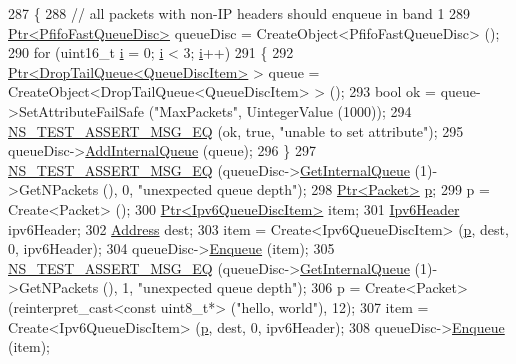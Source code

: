 \begin{DoxyCode}
287 \{
288   \textcolor{comment}{// all packets with non-IP headers should enqueue in band 1}
289   \hyperlink{classns3_1_1Ptr}{Ptr<PfifoFastQueueDisc>} queueDisc = CreateObject<PfifoFastQueueDisc> ();
290   \textcolor{keywordflow}{for} (uint16\_t \hyperlink{bernuolliDistribution_8m_a6f6ccfcf58b31cb6412107d9d5281426}{i} = 0; \hyperlink{bernuolliDistribution_8m_a6f6ccfcf58b31cb6412107d9d5281426}{i} < 3; \hyperlink{bernuolliDistribution_8m_a6f6ccfcf58b31cb6412107d9d5281426}{i}++)
291     \{
292       \hyperlink{classns3_1_1Ptr}{Ptr<DropTailQueue<QueueDiscItem>} > queue = 
      CreateObject<DropTailQueue<QueueDiscItem> > ();
293       \textcolor{keywordtype}{bool} ok = queue->SetAttributeFailSafe (\textcolor{stringliteral}{"MaxPackets"}, UintegerValue (1000));
294       \hyperlink{group__testing_ga2a9d78cffb3db8e867c35fff0b698cf5}{NS\_TEST\_ASSERT\_MSG\_EQ} (ok, \textcolor{keyword}{true}, \textcolor{stringliteral}{"unable to set attribute"});
295       queueDisc->\hyperlink{classns3_1_1QueueDisc_a0599223e2a3976ef042a56c2923a2b61}{AddInternalQueue} (queue);
296     \}
297   \hyperlink{group__testing_ga2a9d78cffb3db8e867c35fff0b698cf5}{NS\_TEST\_ASSERT\_MSG\_EQ} (queueDisc->\hyperlink{classns3_1_1QueueDisc_adf09b498c07c5677c26ea4b8309def74}{GetInternalQueue} (1)->GetNPackets 
      (), 0, \textcolor{stringliteral}{"unexpected queue depth"});
298   \hyperlink{classns3_1_1Ptr}{Ptr<Packet>} \hyperlink{lte__link__budget_8m_ac9de518908a968428863f829398a4e62}{p};
299   p = Create<Packet> ();
300   \hyperlink{classns3_1_1Ptr}{Ptr<Ipv6QueueDiscItem>} item;
301   \hyperlink{classns3_1_1Ipv6Header}{Ipv6Header} ipv6Header;
302   \hyperlink{classns3_1_1Address}{Address} dest;
303   item = Create<Ipv6QueueDiscItem> (\hyperlink{lte__link__budget_8m_ac9de518908a968428863f829398a4e62}{p}, dest, 0, ipv6Header);
304   queueDisc->\hyperlink{classns3_1_1QueueDisc_af452fb01b98fed312125163f1fe85431}{Enqueue} (item);
305   \hyperlink{group__testing_ga2a9d78cffb3db8e867c35fff0b698cf5}{NS\_TEST\_ASSERT\_MSG\_EQ} (queueDisc->\hyperlink{classns3_1_1QueueDisc_adf09b498c07c5677c26ea4b8309def74}{GetInternalQueue} (1)->GetNPackets 
      (), 1, \textcolor{stringliteral}{"unexpected queue depth"});
306   p = Create<Packet> (\textcolor{keyword}{reinterpret\_cast<}\textcolor{keyword}{const }uint8\_t*\textcolor{keyword}{>} (\textcolor{stringliteral}{"hello, world"}), 12);
307   item = Create<Ipv6QueueDiscItem> (\hyperlink{lte__link__budget_8m_ac9de518908a968428863f829398a4e62}{p}, dest, 0, ipv6Header);
308   queueDisc->\hyperlink{classns3_1_1QueueDisc_af452fb01b98fed312125163f1fe85431}{Enqueue} (item);

\end{DoxyCode}
